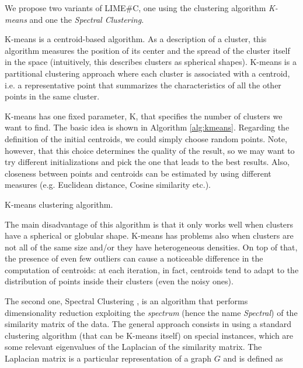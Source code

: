 \documentclass[12pt, twoside, a4paper]{report}
\begin{document}
We propose two variants of LIME\#C, one using the clustering algorithm \textit{K-means} and one the \textit{Spectral Clustering}.

K-means \cite{k-means} is a centroid-based algorithm. As a description of a cluster, this algorithm measures the position of its center and the spread of the cluster itself in the space (intuitively, this describes clusters as spherical shapes).
K-means is a partitional clustering approach where each cluster is associated with a centroid, i.e. a representative point that summarizes the characteristics of all the other points in the same cluster. 

K-means has one fixed parameter, K, that specifies the number of clusters we want to find. The basic idea is shown in Algorithm \ref{alg:kmeans}. Regarding the definition of the initial centroids, we could simply choose random points. Note, however, that this choice determines the quality of the result, so we may want to try different initializations and pick the one that leads to the best results. 
Also, closeness between points and centroids can be estimated by using different measures (e.g. Euclidean distance, Cosine similarity etc.).

\LinesNumbered
{}


\begin{algorithm}
\caption{K-means clustering algorithm.}
\label{alg:kmeans}
\end{algorithm}

The main disadvantage of this algorithm is that it only works well when clusters have a spherical or globular shape. K-means has problems also when clusters are not all of the same size and/or they have heterogeneous densities. On top of that, the presence of even few outliers can cause a noticeable difference in the computation of centroids: at each iteration, in fact, centroids tend to adapt to the distribution of points inside their clusters (even the noisy ones).

\bigskip

The second one, Spectral Clustering \cite{on-spectral-clus,spectral_clustering, spectral-tutorial}, is an algorithm that performs dimensionality reduction exploiting the \textit{spectrum} (hence the name \textit{Spectral}) of the similarity matrix of the data. The general approach consists in using a standard clustering algorithm (that can be K-means itself) on special instances, which are some relevant eigenvalues of the Laplacian of the similarity matrix. The Laplacian matrix is a particular representation of a graph $G$ and is defined as 
\end{document}
